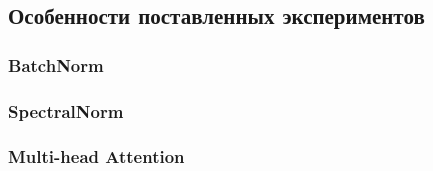 \subsection{Особенности поставленных экспериментов}
\subsubsection{BatchNorm}
\par

\subsubsection{SpectralNorm}
\par


\subsubsection{Multi-head Attention}
\par
